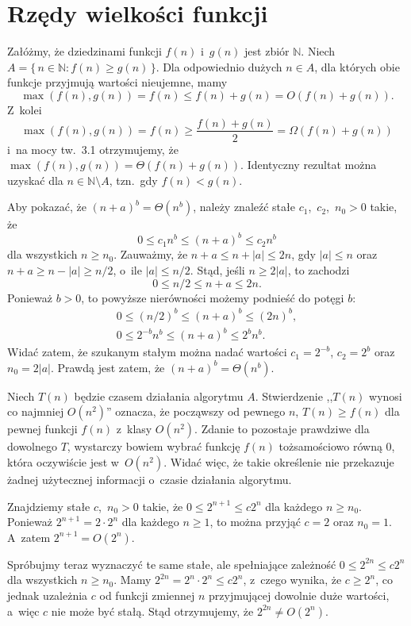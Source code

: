\chapter{Rzędy wielkości funkcji}


\exercise %
Załóżmy, że dziedzinami funkcji $f(n)$ i~$g(n)$ jest zbiór $\mathbb{N}$. Niech $A=\{\,n\in\mathbb{N}:f(n)\ge g(n)\,\}$. Dla odpowiednio dużych $n\in A$, dla których obie funkcje przyjmują wartości nieujemne, mamy
\[
    \max(f(n),g(n)) = f(n) \le f(n)+g(n) = O(f(n)+g(n)).
\]
Z~kolei
\[
    \max(f(n),g(n)) = f(n) \ge \frac{f(n)+g(n)}{2} = \Omega(f(n)+g(n))
\]
i~na mocy tw.~3.1 otrzymujemy, że $\max(f(n),g(n))=\Theta(f(n)+g(n))$. Identyczny rezultat można uzyskać dla $n\in\mathbb{N}\setminus A$, tzn.\ gdy $f(n)<g(n)$.

\exercise %
Aby pokazać, że $(n+a)^b=\Theta(n^b)$, należy znaleźć stałe $c_1$,~$c_2$,~$n_0>0$ takie, że
\[
	0 \le c_1n^b \le (n+a)^b \le c_2n^b
\]
dla wszystkich $n\ge n_0$. Zauważmy, że $n+a\le n+|a|\le2n$, gdy $|a|\le n$ oraz $n+a\ge n-|a|\ge n/2$, o~ile $|a|\le n/2$. Stąd, jeśli $n\ge 2|a|$, to zachodzi
\[
	0 \le n/2 \le n+a \le 2n.
\]
Ponieważ $b>0$, to powyższe nierówności możemy podnieść do potęgi $b$:
\begin{gather*}
	0 \le (n/2)^b \le (n+a)^b \le (2n)^b, \\
	0 \le 2^{-b}n^b \le (n+a)^b \le 2^bn^b.
\end{gather*}
Widać zatem, że szukanym stałym można nadać wartości $c_1=2^{-b}$, $c_2=2^b$ oraz $n_0=2|a|$. Prawdą jest zatem, że $(n+a)^b=\Theta(n^b)$.

\exercise %
Niech $T(n)$ będzie czasem działania algorytmu $A$. Stwierdzenie ,,$T(n)$ wynosi co najmniej $O(n^2)$'' oznacza, że począwszy od pewnego $n$, $T(n)\ge f(n)$ dla pewnej funkcji $f(n)$ z~klasy $O(n^2)$. Zdanie to pozostaje prawdziwe dla dowolnego $T$, wystarczy bowiem wybrać funkcję $f(n)$ tożsamościowo równą 0, która oczywiście jest w~$O(n^2)$. Widać więc, że takie określenie nie przekazuje żadnej użytecznej informacji o~czasie działania algorytmu.

\exercise %
Znajdziemy stałe $c$,~$n_0>0$ takie, że $0\le2^{n+1}\le c2^n$ dla każdego $n\ge n_0$. Ponieważ $2^{n+1}=2\cdot2^n$ dla każdego $n\ge1$, to można przyjąć $c=2$ oraz $n_0=1$. A~zatem $2^{n+1}=O(2^n)$.

Spróbujmy teraz wyznaczyć te same stałe, ale spełniające zależność $0\le2^{2n}\le c2^n$ dla wszystkich $n\ge n_0$. Mamy $2^{2n}=2^n\cdot2^n\le c2^n$, z~czego wynika, że $c\ge2^n$, co jednak uzależnia $c$ od funkcji zmiennej $n$ przyjmującej dowolnie duże wartości, a~więc $c$ nie może być stałą. Stąd otrzymujemy, że $2^{2n}\ne O(2^n)$.

